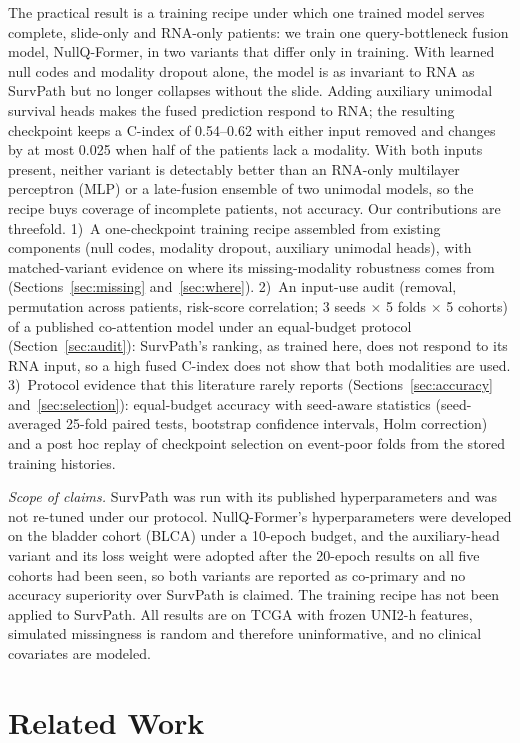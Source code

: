 \documentclass[journal]{IEEEtran}
\newcommand{\pq}{NullQ-Former}
\newcommand{\cindex}{C-index}
\begin{document}
The practical result is a training recipe under which one trained model serves complete, slide-only and RNA-only patients: we train one query-bottleneck fusion model, \pq{}, in two variants that differ only in training. With learned null codes and modality dropout alone, the model is as invariant to RNA as SurvPath but no longer collapses without the slide. Adding auxiliary unimodal survival heads makes the fused prediction respond to RNA; the resulting checkpoint keeps a \cindex{} of 0.54--0.62 with either input removed and changes by at most 0.025 when half of the patients lack a modality. With both inputs present, neither variant is detectably better than an RNA-only multilayer perceptron (MLP) or a late-fusion ensemble of two unimodal models, so the recipe buys coverage of incomplete patients, not accuracy. Our contributions are threefold. 1)~A one-checkpoint training recipe assembled from existing components (null codes, modality dropout, auxiliary unimodal heads), with matched-variant evidence on where its missing-modality robustness comes from (Sections~\ref{sec:missing} and~\ref{sec:where}). 2)~An input-use audit (removal, permutation across patients, risk-score correlation; 3 seeds $\times$ 5 folds $\times$ 5 cohorts) of a published co-attention model under an equal-budget protocol (Section~\ref{sec:audit}): SurvPath's ranking, as trained here, does not respond to its RNA input, so a high fused \cindex{} does not show that both modalities are used. 3)~Protocol evidence that this literature rarely reports (Sections~\ref{sec:accuracy} and~\ref{sec:selection}): equal-budget accuracy with seed-aware statistics (seed-averaged 25-fold paired tests, bootstrap confidence intervals, Holm correction) and a post hoc replay of checkpoint selection on event-poor folds from the stored training histories.

\textit{Scope of claims.} SurvPath was run with its published hyperparameters and was not re-tuned under our protocol. \pq{}'s hyperparameters were developed on the bladder cohort (BLCA) under a 10-epoch budget, and the auxiliary-head variant and its loss weight were adopted after the 20-epoch results on all five cohorts had been seen, so both variants are reported as co-primary and no accuracy superiority over SurvPath is claimed. The training recipe has not been applied to SurvPath. All results are on TCGA with frozen UNI2-h features, simulated missingness is random and therefore uninformative, and no clinical covariates are modeled.

\section{Related Work}
\label{sec:related}
\end{document}
